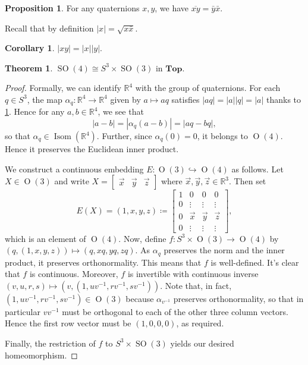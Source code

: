 \documentclass[10pt,letterpaper,cm]{nupset}
\theoremstyle{definition}
\theoremstyle{theorem}
\newtheorem{theorem}[definition]{Theorem}
\newtheorem{cor}[definition]{Corollary}
\newtheorem{prop}[definition]{Proposition}
\theoremstyle{remark}
\newcommand{\R}{\mathbb R}
\newcommand{\1}{\mathbf{1}}
\newcommand{\x}{\vec x}
\newcommand{\y}{\vec y}
\newcommand{\z}{\vec z}
\newcommand{\0}{\vec {0}}
\DeclareMathOperator{\ORT}{O}
\DeclareMathOperator{\Isom}{Isom}
\DeclareMathOperator{\SO}{SO}
\begin{document}
\bigskip

\begin{prop}
For any quaternions $x,y$, we have $\overline{xy}=\bar{y}\bar{x}$.
\end{prop}

\smallskip

Recall that by definition $\left\lvert{x}\right\rvert=\sqrt{x\bar{x}}$.

\begin{cor}\label{mult}
$\left\lvert{xy}\right\rvert=\left\lvert{x}\right\rvert \left\lvert{y}\right\rvert$.
\end{cor}
 

\begin{theorem}
$\SO(4) \cong S^3\times \SO(3)$ in $\mathbf{Top}$.
\end{theorem}

\begin{proof}
Formally, we can identify $\R^4$ with the group of quaternions. For each $q\in S^3$, the map $\alpha_q :\R^4\to \R^4$ given by $a\mapsto aq$ satisfies $\left\lvert{aq}\right\rvert=\left\lvert{a}\right\rvert\left\lvert{q}\right\rvert=\left\lvert{a}\right\rvert$ thanks to \cref{mult}. Hence for any $a,b\in \R^4$, we see that $$\left\lvert{a-b}\right\rvert=\left\lvert{\alpha_q(a-b)}\right\rvert=\left\lvert{aq-bq}\right\rvert,$$ so that $\alpha_q \in \Isom(\R^4)$. Further, since $\alpha_q(0)=0$, it belongs to $\ORT(4)$. Hence it preserves the Euclidean inner product.

\smallskip

We construct a continuous embedding $E : \ORT(3)\hookrightarrow \ORT(4)$ as follows. Let $X\in \ORT(3)$ and write $X=\begin{bmatrix} \x & \y & \z \end{bmatrix}$ where $\x, \y, \z \in \R^3$. Then set $$E(X)=\left(1, x, y, z\right)\coloneqq \begin{bmatrix} 1 & 0 & 0 & 0 \\ 0 &  \vdots & \vdots & \vdots \\ 0 &\x & \y & \z  \\ 0 & \vdots & \vdots & \vdots \end{bmatrix},$$ which is an element of $\ORT (4)$. Now, define $f: S^3\times \ORT(3) \to \ORT(4)$ by $\left(q, \left(1,x, y, z\right)\right)\mapsto \left(q, xq, yq, zq\right)$. As $\alpha_q$ preserves the norm and the inner product, it preserves orthonormality. This means that $f$ is well-defined.  It's clear that $f$ is continuous. Moreover, $f$ is invertible with continuous inverse $\left(v, u, r, s\right)\mapsto \left(v, \left(1, uv^{-1}, rv^{-1}, sv^{-1}\right)\right)$. Note that, in fact, $\left(1, uv^{-1}, rv^{-1}, sv^{-1}\right)\in \ORT(3)$ because $\alpha_{v^{-1}}$ preserves orthonormality, so that in particular $vv^{-1}$ must be orthogonal to each of the other three column vectors. Hence the first row vector must be $\left(1,0,0,0\right)$, as required.  

\smallskip

Finally, the restriction of $f$ to $S^3 \times \SO(3)$ yields our desired homeomorphism.  
\end{proof}
\end{document}
